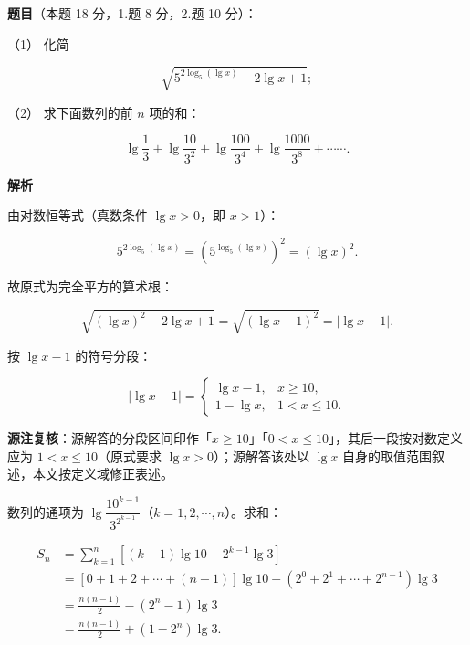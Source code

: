\begin{answer}

\textbf{题目}（本题 18 分，1.题 8 分，2.题 10 分）：

（1） 化简

\nopagebreak[4]
\[
\sqrt{5^{2\log_5(\lg x)}-2\lg x+1};
\]

（2） 求下面数列的前 $n$ 项的和：

\nopagebreak[4]
\[
\lg\frac13+\lg\frac{10}{3^2}+\lg\frac{100}{3^4}+\lg\frac{1000}{3^8}+\cdots\cdots.
\]

\textbf{解析}


由对数恒等式（真数条件 $\lg x>0$，即 $x>1$）：

\nopagebreak[4]
\[
5^{2\log_5(\lg x)}
=\left(5^{\log_5(\lg x)}\right)^2
=(\lg x)^2.
\]

故原式为完全平方的算术根：

\nopagebreak[4]
\[
\sqrt{(\lg x)^2-2\lg x+1}
=\sqrt{(\lg x-1)^2}
=|\lg x-1|.
\]

按 $\lg x-1$ 的符号分段：

\nopagebreak[4]
\[
|\lg x-1|=
\begin{cases}
\lg x-1, & x\geqslant10,\\[2pt]
1-\lg x, & 1<x\leqslant10.
\end{cases}
\]

\begin{gktip}
\textbf{源注复核}：源解答的分段区间印作「$x\geqslant10$」「$0<x\leqslant10$」，其后一段按对数定义应为 $1<x\leqslant10$（原式要求 $\lg x>0$）；源解答该处以 $\lg x$ 自身的取值范围叙述，本文按定义域修正表述。
\end{gktip}


数列的通项为 $\lg\dfrac{10^{k-1}}{3^{2^{k-1}}}$（$k=1,2,\cdots,n$）。求和：

\nopagebreak[4]
\[
\begin{aligned}
S_n
&=\sum_{k=1}^{n}\left[(k-1)\lg10-2^{k-1}\lg3\right]\\
&=\left[0+1+2+\cdots+(n-1)\right]\lg10-\left(2^0+2^1+\cdots+2^{n-1}\right)\lg3\\
&=\frac{n(n-1)}{2}-(2^n-1)\lg3\\
&=\frac{n(n-1)}{2}+(1-2^n)\lg3.
\end{aligned}
\]



\end{answer}
